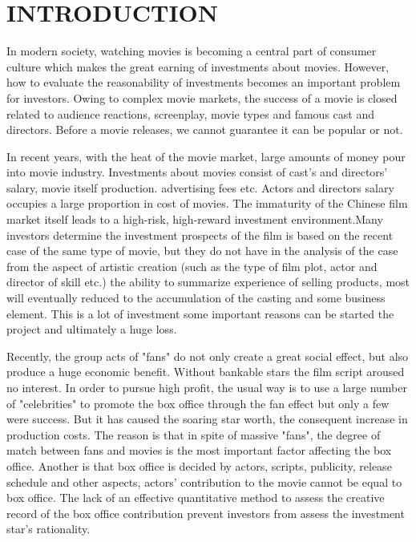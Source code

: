 \section{INTRODUCTION}
\par In modern society, watching movies is becoming a central part of consumer culture which makes the great earning of investments about movies. However, how to evaluate the reasonability of investments becomes an important problem for investors. Owing to complex movie markets,  the success of a movie is closed related to audience reactions, screenplay, movie types and famous cast and directors.  Before a movie releases, we cannot guarantee it can be popular or not.
\par In recent years, with the heat of the movie market, large amounts of money pour into movie industry. Investments about movies consist of cast's and directors' salary,  movie itself production. advertising fees etc. Actors and directors salary occupies a large proportion in cost of movies. The immaturity of the Chinese film market itself leads to a high-risk, high-reward investment environment.Many investors determine the investment prospects of the film is based on the recent case of the same type of movie, but they do not have in the analysis of the case from the aspect of artistic creation (such as the type of film plot, actor and director of skill etc.) the ability to summarize experience of selling products, most will eventually reduced to the accumulation of the casting and some business element. This is a lot of investment some important reasons can be started the project and ultimately a huge loss.
\par Recently, the group acts of "fans" do not only create a great social effect, but also produce a huge economic benefit. Without bankable stars the film script aroused no interest. In order to pursue high profit, the usual way is to use a large number of "celebrities" to promote the box office through the fan effect but only a few were success. But it has caused the soaring star worth, the consequent increase in production costs. The reason is that in spite of massive "fans", the degree of match between fans and movies is the most important factor affecting the box office. Another is that box office is decided by actors, scripts, publicity, release schedule and other aspects, actors' contribution to the movie cannot be equal to box office. The lack of an effective quantitative method to assess the creative record of the box office contribution prevent investors from assess the investment star's rationality.
